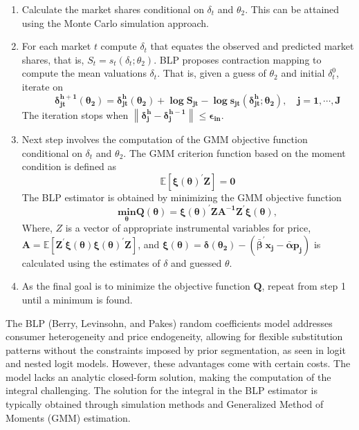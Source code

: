 \documentclass[a4paper,11pt]{article}
\begin{document}
    \begin{enumerate}
        \item Calculate the market shares conditional on $\delta_{t}$ and $\theta_{2}$. This can be attained using the Monte Carlo simulation approach.
        \item For each market $t$ compute $\delta_{t}$ that equates the observed and predicted market shares, that is, $S_{t} = s_{t}(\delta_{t};\theta_{2})$. BLP proposes contraction mapping to compute the mean valuations $\delta_{t}$. That is, given a guess of $\theta_{2}$ and initial $\delta_{t}^{0}$, iterate on
        \begin{equation*}
            \qquad \mathbf{\delta_{jt}^{h+1}(\theta_{2}) = \delta_{jt}^{h}(\theta_{2}) + \log S_{jt} - \log s_{jt}(\delta_{jt}^{h};\theta_{2}),\quad j = 1,\cdots, J}
        \end{equation*}
        The iteration stops when $\mathbf{\left\|\delta_{j}^{h} - \delta_{j}^{h-1}\right\| \leq \epsilon_{in}}$. 
        \item Next step involves the computation of the GMM objective function conditional on $\delta_{t}$ and $\theta_{2}$. The GMM criterion function based on the moment condition is defined as
        \begin{equation*}
            \qquad \mathbf{\mathbb{E}\left[\xi(\theta)^{\prime} Z \right] = 0}
        \end{equation*}
        The BLP estimator is obtained by minimizing the GMM objective function
        \begin{equation*}
            \qquad \mathbf{\underset{\theta}{min} Q(\theta) = \xi(\theta)^{\prime}ZA^{-1}Z^{\prime}\xi(\theta)},
        \end{equation*}
        Where, $Z$ is a vector of appropriate instrumental variables for price, $\mathbf{A = \mathbb{E} \left[Z^{\prime} \xi(\theta) \xi(\theta)^{\prime} Z \right]}$, and \newline $\mathbf{\xi(\theta) = \delta(\theta_{2}) - (\bar{\beta}^{\prime} x_{j} - \bar{\alpha} p_{j})}$ is calculated using the estimates of $\delta$ and guessed $\theta$.
        \item As the final goal is to minimize the objective function $\mathbf{Q}$, repeat from step 1 until a minimum is found.
    \end{enumerate}

    The BLP (Berry, Levinsohn, and Pakes) random coefficients model addresses consumer heterogeneity and price endogeneity, allowing for flexible substitution patterns without the constraints imposed by prior segmentation, as seen in logit and nested logit models. However, these advantages come with certain costs. The model lacks an analytic closed-form solution, making the computation of the integral challenging. The solution for the integral in the BLP estimator is typically obtained through simulation methods and Generalized Method of Moments (GMM) estimation.\\
\end{document}
